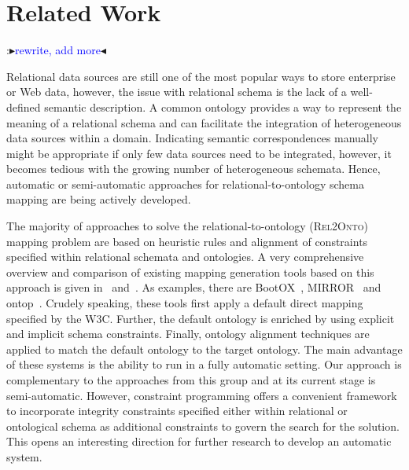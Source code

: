 \documentclass[letterpaper]{article} %
\newcommand{\authornote}[3]{
  {\fbox{\sc 
  #1}:$\blacktriangleright$\textcolor{#2}{\small{#3}}$\blacktriangleleft$}%
}
\newcommand{\ddg}[1]{\authornote{DDG}{blue}{#1}}
\newcommand{\relonto}{\textsc{Rel2Onto}}
\begin{document}
\section{Related Work \label{SEC:pw}}
\ddg{rewrite, add more}

Relational data sources are still one of the most popular ways to store enterprise or Web data, however, the issue with relational schema is the lack of a well-defined semantic description.
A common ontology provides a way to represent the meaning of a relational schema and can facilitate the integration of heterogeneous data sources within a domain.
Indicating semantic correspondences manually might be appropriate if only few data sources need to be integrated, however, it becomes tedious with the growing number of heterogeneous schemata.
Hence, automatic or semi-automatic approaches for relational-to-ontology schema mapping are being actively developed.


The majority of approaches to solve the relational-to-ontology (\relonto{}) mapping problem are based on heuristic rules and alignment of constraints specified within relational schemata and ontologies.
A very comprehensive overview and comparison of existing mapping generation tools based on this approach is given in~\cite{Pinkel:rodi} and~\cite{Spanos:semweb}.
As examples, there are BootOX~\cite{Jimenez:Bootox}, MIRROR~\cite{Luciano:Mirror} and  ontop~\cite{Fagin:Clio}.
Crudely speaking, these tools first apply a default direct mapping specified by the W3C.
Further, the default ontology is enriched by using explicit and implicit schema constraints.
Finally, ontology alignment techniques are applied to match the default ontology to the target ontology.
The main advantage of these systems is the ability to run in a fully automatic setting.
Our approach is complementary to the approaches from this group and at its current stage is semi-automatic.
However, constraint programming offers a convenient framework to incorporate integrity constraints specified either within relational or ontological schema as additional constraints to govern the search for the solution.
This opens an interesting direction for further research to develop an automatic system.
\end{document}
